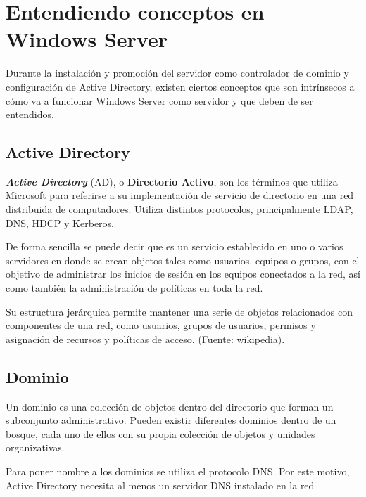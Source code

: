 \section{Entendiendo conceptos en Windows Server}
Durante la instalación y promoción del servidor como controlador de dominio y configuración de Active Directory, existen ciertos conceptos que son intrínsecos a cómo va a funcionar Windows Server como servidor  y que deben de ser entendidos.


\subsection{Active Directory}
\textbf{\textit{Active Directory}} (AD), o \textbf{Directorio Activo}, son los términos que utiliza Microsoft para referirse a su implementación de servicio de directorio en una red distribuida de computadores. Utiliza distintos protocolos, principalmente \href{https://es.wikipedia.org/wiki/Protocolo_ligero_de_acceso_a_directorios}{LDAP}, \href{https://es.wikipedia.org/wiki/Sistema_de_nombres_de_dominio}{DNS}, \href{https://es.wikipedia.org/wiki/Protocolo_de_configuraci%C3%B3n_din%C3%A1mica_de_host}{HDCP} y \href{https://es.wikipedia.org/wiki/Kerberos}{Kerberos}.

De forma sencilla se puede decir que es un servicio establecido en uno o varios servidores en donde se crean objetos tales como usuarios, equipos o grupos, con el objetivo de administrar los inicios de sesión en los equipos conectados a la red, así como también la administración de políticas en toda la red.

Su estructura jerárquica permite mantener una serie de objetos relacionados con componentes de una red, como usuarios, grupos de usuarios, permisos y asignación de recursos y políticas de acceso. (Fuente: \href{https://es.wikipedia.org/wiki/Active_Directory}{wikipedia}).


\subsection{Dominio}
Un dominio es una colección de objetos dentro del directorio que forman un subconjunto administrativo. Pueden existir diferentes dominios dentro de un bosque, cada uno de ellos con su propia colección de objetos y unidades organizativas.

Para poner nombre a los dominios se utiliza el protocolo DNS. Por este motivo, Active Directory necesita al menos un servidor DNS instalado en la red

